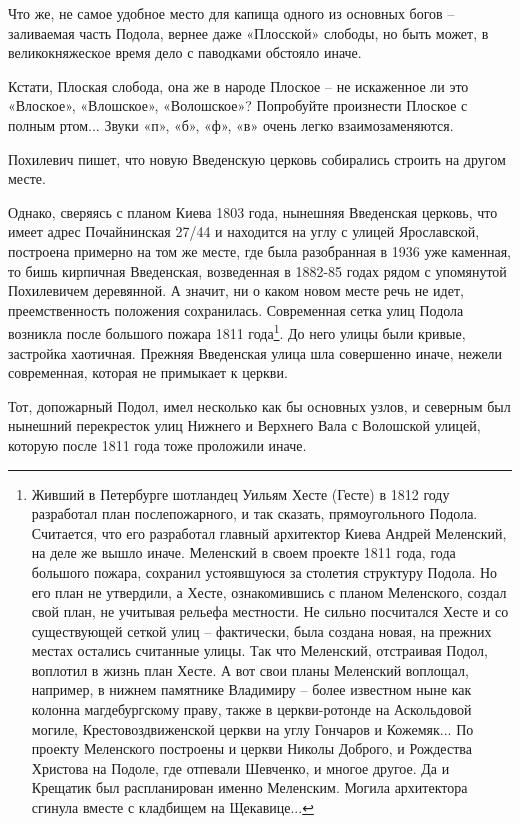 \documentclass[a5paper,11pt,openany]{article}
\begin{document}
Что же, не самое удобное место для капища одного из основных богов – заливаемая часть Подола, вернее даже «Плосской» слободы, но быть может, в великокняжеское время дело с паводками обстояло иначе.

Кстати, Плоская слобода, она же в народе Плоское – не искаженное ли это «Влоское», «Влошское», «Волошское»? Попробуйте произнести Плоское с полным ртом... Звуки «п», «б», «ф», «в» очень легко взаимозаменяются.

Похилевич пишет, что новую Введенскую церковь собирались строить на другом месте.

Однако, сверяясь с планом Киева 1803 года,
нынешняя Введенская церковь, что имеет адрес Почайнинская 27/44 и находится на углу с улицей Ярославской, построена примерно на том же месте, где была разобранная в 1936 уже каменная, то бишь кирпичная Введенская, возведенная в 1882-85 годах рядом с упомянутой Похилевичем деревянной. А значит, ни о каком новом месте речь не идет, 
преемственность положения сохранилась.
Современная сетка улиц Подола возникла после большого пожара 1811 года\footnote{Живший в Петербурге шотландец Уильям Хесте (Гесте) в 1812 году разработал план послепожарного, и так сказать, прямоугольного Подола. Считается, что его разработал главный архитектор Киева Андрей Меленский, на деле же вышло иначе. Меленский в своем проекте 1811 года, года большого пожара, сохранил устоявшуюся за столетия структуру Подола. Но его план не утвердили, а Хесте, ознакомившись с планом Меленского, создал свой план, не учитывая рельефа местности. Не сильно посчитался Хесте и со существующей сеткой улиц – фактически, была создана новая, на прежних местах остались считанные улицы. Так что Меленский, отстраивая Подол, воплотил в жизнь план Хесте. А вот свои планы Меленский воплощал, например, в нижнем памятнике Владимиру – более известном ныне как колонна магдебургскому праву, также в церкви-ротонде на Аскольдовой могиле, Крестовоздвиженской церкви на углу Гончаров и Кожемяк... По проекту Меленского построены и церкви Николы Доброго, и Рождества Христова на Подоле, где отпевали Шевченко, и многое другое. Да и Крещатик был распланирован именно Меленским. Могила архитектора сгинула вместе с кладбищем на Щекавице...}. До него улицы были кривые, застройка хаотичная. Прежняя Введенская улица шла совершенно иначе, нежели современная, которая не примыкает к церкви.

Тот, допожарный Подол, имел несколько как бы основных узлов, и северным был нынешний перекресток улиц Нижнего и Верхнего Вала с Волошской улицей, которую после 1811 года тоже проложили иначе. 
\end{document}
